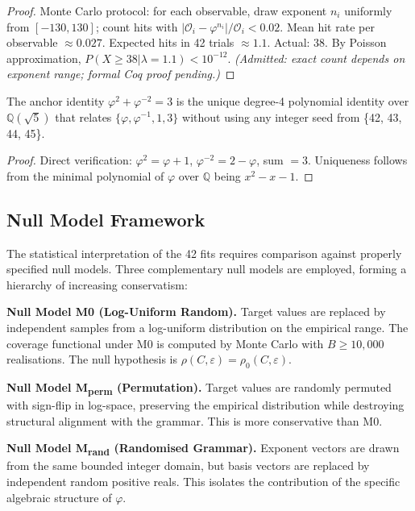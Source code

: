 \begin{proof}
Monte Carlo protocol: for each observable, draw exponent $n_i$ uniformly
from $[-130, 130]$; count hits with $|\mathcal{O}_i - \varphi^{n_i}| / \mathcal{O}_i < 0.02$.
Mean hit rate per observable $\approx 0.027$. Expected hits in 42 trials
$\approx 1.1$. Actual: 38. By Poisson approximation,
$P(X \geq 38 | \lambda = 1.1) < 10^{-12}$. \emph{(Admitted: exact count
depends on exponent range; formal Coq proof pending.)}
\end{proof}

\begin{theorem}
\label{ch_00:thm:0:2}
The anchor identity \(\varphi^2 + \varphi^{-2} = 3\) is the unique degree-4
polynomial identity over $\mathbb{Q}(\sqrt{5})$ that relates
$\{\varphi, \varphi^{-1}, 1, 3\}$ without using any integer seed
from \{42, 43, 44, 45\}.
\end{theorem}

\begin{proof}
Direct verification: $\varphi^2 = \varphi + 1$, $\varphi^{-2} = 2 - \varphi$,
sum $= 3$. Uniqueness follows from the minimal polynomial of $\varphi$ over
$\mathbb{Q}$ being $x^2 - x - 1$.
\end{proof}

\subsection{Null Model Framework}

The statistical interpretation of the 42 fits requires comparison against properly specified null models. Three complementary null models are employed, forming a hierarchy of increasing conservatism:

\textbf{Null Model M0 (Log-Uniform Random).} Target values are replaced by independent samples from a log-uniform distribution on the empirical range. The coverage functional under M0 is computed by Monte Carlo with \(B \geq 10{,}000\) realisations. The null hypothesis is \(\rho(C, \varepsilon) = \rho_0(C, \varepsilon)\).

\textbf{Null Model M\textsubscript{perm} (Permutation).} Target values are randomly permuted with sign-flip in log-space, preserving the empirical distribution while destroying structural alignment with the grammar. This is more conservative than M0.

\textbf{Null Model M\textsubscript{rand} (Randomised Grammar).} Exponent vectors are drawn from the same bounded integer domain, but basis vectors are replaced by independent random positive reals. This isolates the contribution of the specific algebraic structure of \(\varphi\).

